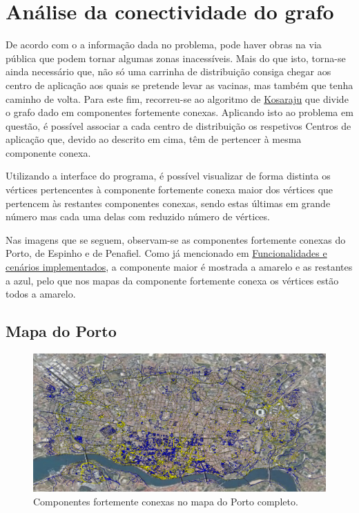 \documentclass[12pt,a4paper]{report}
\begin{document}
\chapter{Análise da conectividade do grafo}
De acordo com o a informação dada no problema, pode haver obras na via pública que podem tornar algumas zonas inacessíveis.
Mais do que isto, torna-se ainda necessário que, não só uma carrinha de distribuição consiga chegar aos centro de
aplicação aos quais se pretende levar as vacinas, mas também que tenha caminho de volta. Para este fim, recorreu-se
ao algoritmo de \hyperref[algo:kosaraju]{Kosaraju} que divide o grafo dado em componentes fortemente conexas.
Aplicando isto ao problema em questão, é possível associar a cada centro de distribuição os respetivos Centros 
de aplicação que, devido ao descrito em cima, têm de pertencer à mesma componente conexa. \par

Utilizando a interface do programa, é possível visualizar de forma distinta os vértices pertencentes à
componente fortemente conexa maior dos vértices que pertencem às restantes componentes conexas, sendo estas últimas em grande número
mas cada uma delas com reduzido número de vértices. \par
Nas imagens que se seguem, observam-se as componentes fortemente conexas do Porto, de Espinho e de Penafiel. Como já mencionado 
em \hyperref[func]{Funcionalidades e cenários implementados}, a componente maior é mostrada a amarelo e as restantes a azul, pelo que
nos mapas da componente fortemente conexa os vértices estão todos a amarelo.


\section{Mapa do Porto}

\begin{figure}[H]
	\includegraphics[width=1.0\textwidth]{./imgs/scc/portoSCC.png}
	\centering
	\caption{Componentes fortemente conexas no mapa do Porto completo.}
\end{figure}
\end{document}

